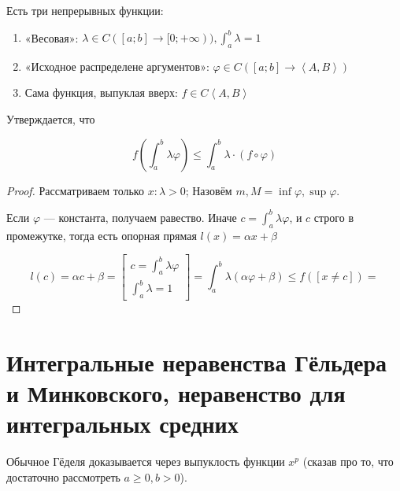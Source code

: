 \documentclass[12pt, a4paper]{article}
\begin{document}
\begin{theorem} 
    
    Есть три непрерывных функции:

    \begin{enumerate}
        \item «Весовая»: $\lambda \in C([a; b] → [0; + \infty)), \int^b_a \lambda = 1$
        \item «Исходное распределене аргументов»: $\varphi \in C([a; b] → \left\langle A, B \right\rangle)$
        \item Сама функция, выпуклая вверх: $f \in C\left\langle A, B \right\rangle$
    \end{enumerate}
    
    Утверждается, что 
    
    \begin{equation}
        f\left( \int^b_a \lambda \varphi \right) \leqslant \int^b_a \lambda \cdot \left(f \circ \varphi\right)
    \end{equation}
    
    \begin{proof}
        Рассматриваем только $x: \lambda > 0$;
        Назовём $m, M = \inf \varphi, \sup \varphi$.
        
        Если $\varphi$ — константа, получаем равество.
        Иначе $c = \int^b_a \lambda \varphi$, и $c$ строго в промежутке, 
        тогда есть опорная прямая $l(x) = \alpha x + \beta$

        \begin{equation}
            l(c) = \alpha c + \beta = 
            \begin{bmatrix}
                c = \int^b_a \lambda \varphi \\
                \int^b_a \lambda = 1
            \end{bmatrix}
            = \int^b_a \lambda (\alpha \varphi + \beta) 
            \leqslant f([x \neq c]) = 
        \end{equation}
    \end{proof} 
\end{theorem}


\section{Интегральные неравенства Гёльдера и Минковского, неравенство для интегральных средних}

    Обычное Гёделя доказывается через выпуклость функции $x^p$ (сказав про то, что достаточно рассмотреть $a \geqslant 0, b > 0$).
\end{document}
